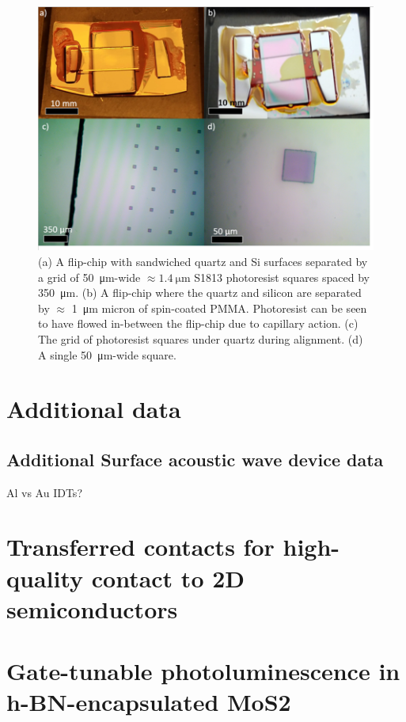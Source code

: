 \documentclass[double,12pt,1in,seploa]{beavtex}
\let\Oldsection\section
\renewcommand{\section}{\FloatBarrier\Oldsection}
\begin{document}
\begin{figure}
    \includegraphics[width = 1\textwidth]{photoresist flip-chips.png}
    \caption{(a) A flip-chip with sandwiched quartz and Si surfaces separated by a grid of \SI{50}{\micro\meter}-wide $\approx \SI{1.4}{\micro\meter}$ S1813 photoresist squares spaced by \SI{350}{\micro\meter}. (b) A flip-chip where the quartz and silicon are separated by $\approx$ \SI{1}{\micro\meter} micron of spin-coated PMMA. Photoresist can be seen to have flowed in-between the flip-chip due to capillary action. (c) The grid of photoresist squares under quartz during alignment. (d) A single \SI{50}{\micro\meter}-wide square.
    }
    \label{PRFC}
\end{figure}

\chapter{Additional data}

\section{Additional Surface acoustic wave device data}
Al vs Au IDTs?

\chapter{Transferred contacts for high-quality contact to 2D semiconductors}

\chapter{Gate-tunable photoluminescence in h-BN-encapsulated MoS2}
\end{document}
